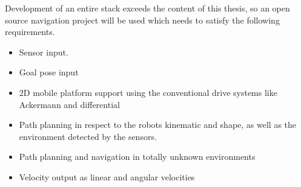 Development of an entire stack exceeds the content of this thesis, so an open source navigation project will be used which needs to satisfy the following requirements.
\begin{itemize}
	\item Sensor input.
	\item Goal pose input
	\item 2D mobile platform support using the conventional drive systems like Ackermann and differential
	\item Path planning in respect to the robots kinematic and shape, as well as the environment detected by the sensors.
	\item Path planning and navigation in totally unknown environments
	\item Velocity output as linear and angular velocities
\end{itemize}


